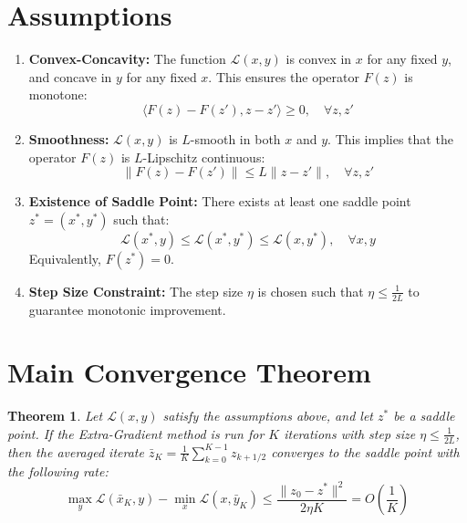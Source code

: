 \documentclass{article}
\newtheorem{theorem}{Theorem}
\begin{document}
\section*{Assumptions}
\begin{enumerate}
\item \textbf{Convex-Concavity:} The function $\mathcal{L}(x, y)$ is convex in $x$ for any fixed $y$, and concave in $y$ for any fixed $x$. This ensures the operator $F(z)$ is monotone:
$$
\langle F(z) - F(z'), z - z' \rangle \geq 0, \quad \forall z, z'
$$
\item \textbf{Smoothness:} $\mathcal{L}(x, y)$ is $L$-smooth in both $x$ and $y$. This implies that the operator $F(z)$ is $L$-Lipschitz continuous:
$$
\|F(z) - F(z')\| \leq L \|z - z'\|, \quad \forall z, z'
$$
\item \textbf{Existence of Saddle Point:} There exists at least one saddle point $z^* = (x^*, y^*)$ such that:
$$
\mathcal{L}(x^*, y) \leq \mathcal{L}(x^*, y^*) \leq \mathcal{L}(x, y^*), \quad \forall x, y
$$
Equivalently, $F(z^*) = 0$.
\item \textbf{Step Size Constraint:} The step size $\eta$ is chosen such that $\eta \leq \frac{1}{2L}$ to guarantee monotonic improvement.
\end{enumerate}

\section*{Main Convergence Theorem}
\begin{theorem}
Let $\mathcal{L}(x,y)$ satisfy the assumptions above, and let $z^*$ be a saddle point. If the Extra-Gradient method is run for $K$ iterations with step size $\eta \leq \frac{1}{2L}$, then the averaged iterate $\bar{z}_K = \frac{1}{K} \sum_{k=0}^{K-1} z_{k+1/2}$ converges to the saddle point with the following rate:
$$
\max_{y} \mathcal{L}(\bar{x}_K, y) - \min_{x} \mathcal{L}(x, \bar{y}_K) \leq \frac{\|z_0 - z^*\|^2}{2 \eta K} = O\left(\frac{1}{K}\right)
$$
\end{theorem}
\end{document}

